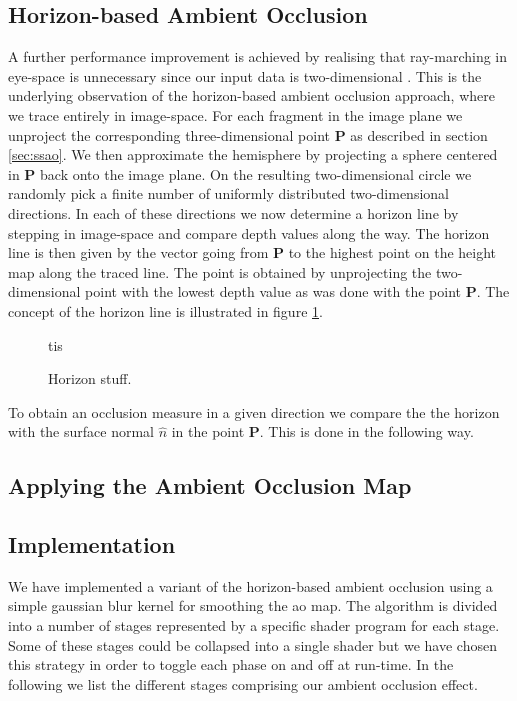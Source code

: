 \subsection{Horizon-based Ambient Occlusion}
A further performance improvement is achieved by realising that
ray-marching in eye-space is unnecessary since our input data is
two-dimensional \citep{hbao}. This is the underlying observation of
the horizon-based ambient occlusion approach, where we trace entirely
in image-space. For each fragment in the image plane we unproject the
corresponding three-dimensional point $\mathbf{P}$ as described in
section \ref{sec:ssao}. We then approximate the hemisphere by
projecting a sphere centered in $\mathbf{P}$ back onto the image
plane. On the resulting two-dimensional circle we randomly pick a
finite number of uniformly distributed two-dimensional directions. In
each of these directions we now determine a horizon line by stepping
in image-space and compare depth values along the way. The horizon
line is then given by the vector going from $\mathbf{P}$ to the
highest point on the height map along the traced line. The point is
obtained by unprojecting the two-dimensional point with the lowest
depth value as was done with the point $\mathbf{P}$. The concept of
the horizon line is illustrated in figure \ref{fig:horizon}.
\begin{figure}[h]
  \centering
  tis
  \caption{Horizon stuff.}
  \label{fig:horizon}
\end{figure}
To obtain an occlusion measure in a given direction we compare the
the horizon with the surface normal $\hat{n}$ in the point
$\mathbf{P}$. This is done in the following way.

\subsection{Applying the Ambient Occlusion Map}

\subsection{Implementation}

We have implemented a variant of the horizon-based ambient occlusion
using a simple gaussian blur kernel for smoothing the ao map. The
algorithm is divided into a number of stages represented by a specific
shader program for each stage. Some of these stages could be collapsed
into a single shader but we have chosen this strategy in order to
toggle each phase on and off at run-time. In the following we list the
different stages comprising our ambient occlusion effect.

